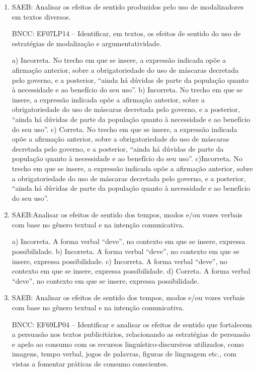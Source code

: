 
\begin{enumerate}

\item
SAEB: Analisar os efeitos de sentido produzidos pelo uso de modalizadores em textos diversos.

BNCC: EF07LP14 -- Identificar, em textos, os efeitos de sentido do
uso de estratégias de modalização e argumentatividade.

a) Incorreta. No trecho em que se insere, a expressão indicada opõe a afirmação anterior, sobre
a obrigatoriedade do uso de máscaras decretada pelo governo, e a posterior, ``ainda há dúvidas 
de parte da população quanto à necessidade e ao benefício do seu uso''. 
b) Incorreta. No trecho em que se insere, a expressão indicada opõe a afirmação anterior, sobre
a obrigatoriedade do uso de máscaras decretada pelo governo, e a posterior, ``ainda há dúvidas 
de parte da população quanto à necessidade e ao benefício do seu uso''.
c) Correta. No trecho em que se insere, a expressão indicada opõe a afirmação anterior, sobre
a obrigatoriedade do uso de máscaras decretada pelo governo, e a posterior, ``ainda há dúvidas 
de parte da população quanto à necessidade e ao benefício do seu uso''.
c)Incorreta. No trecho em que se insere, a expressão indicada opõe a afirmação anterior, sobre
a obrigatoriedade do uso de máscaras decretada pelo governo, e a posterior, ``ainda há dúvidas 
de parte da população quanto à necessidade e ao benefício do seu uso''.

\item
SAEB:Analisar os efeitos de sentido dos tempos, modos e/ou vozes verbais
com base no gênero textual e na intenção comunicativa.

a) Incorreta. A forma verbal ``deve'', no contexto em que se insere, expressa possibilidade.
b) Incorreta. A forma verbal ``deve'', no contexto em que se insere, expressa possibilidade.
c) Incorreta. A forma verbal ``deve'', no contexto em que se insere, expressa possibilidade.
d) Correta. A forma verbal ``deve'', no contexto em que se insere, expressa possibilidade.

\item
SAEB: Analisar os efeitos de sentido dos tempos, modos e/ou vozes
verbais com base no gênero textual e na intenção comunicativa.

BNCC: EF69LP04 -- Identificar e analisar os efeitos de sentido
que fortalecem a persuasão nos textos publicitários, relacionando as
estratégias de persuasão e apelo ao consumo com os recursos
linguístico-discursivos utilizados, como imagens, tempo verbal, jogos de
palavras, figuras de linguagem etc., com vistas a fomentar práticas de
consumo conscientes.


\end{enumerate}
